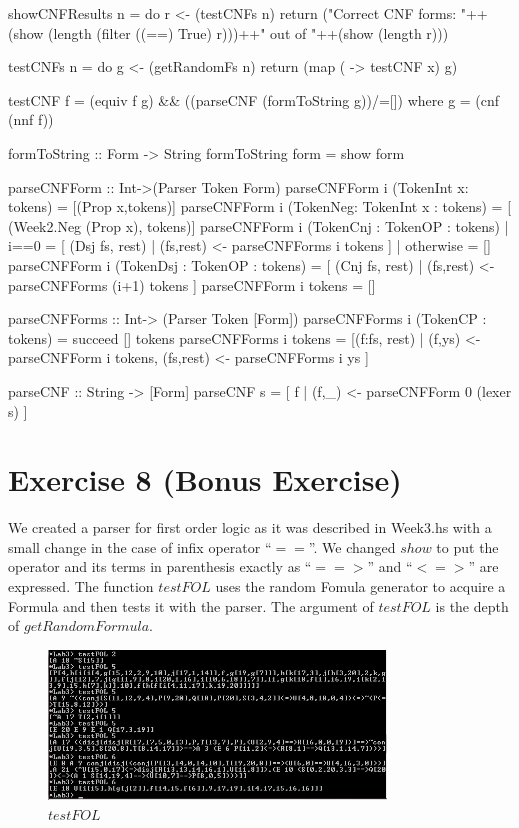 \documentclass{article}
\begin{document}
\begin{code}
showCNFResults n = do
		      r <- (testCNFs n)
		      return ("Correct CNF forms: "++(show (length (filter ((==)
				True) r)))++" out of "++(show (length r)))

testCNFs n = do
		      g <- (getRandomFs n)
		      return (map ( \x -> testCNF x) g)
 
testCNF f = (equiv f g) && ((parseCNF (formToString g))/=[]) where g = (cnf (nnf f))
 
formToString :: Form -> String
formToString form = show form

parseCNFForm :: Int->(Parser Token Form) 
parseCNFForm i (TokenInt x: tokens) = [(Prop x,tokens)]
parseCNFForm i (TokenNeg: TokenInt x : tokens) = [ (Week2.Neg (Prop x), tokens)]
parseCNFForm i (TokenCnj : TokenOP : tokens) | i==0 = [ (Dsj fs, rest) | (fs,rest) <- parseCNFForms i tokens ]
					     | otherwise = []
parseCNFForm i (TokenDsj : TokenOP : tokens) = [ (Cnj fs, rest) | (fs,rest) <- parseCNFForms (i+1) tokens ]
parseCNFForm i tokens = []

parseCNFForms :: Int-> (Parser Token [Form]) 
parseCNFForms i (TokenCP : tokens) = succeed [] tokens
parseCNFForms i tokens = [(f:fs, rest) | (f,ys) <- parseCNFForm i tokens, (fs,rest) <- parseCNFForms i ys ]

parseCNF :: String -> [Form]
parseCNF s = [ f | (f,_) <- parseCNFForm 0 (lexer s) ]
\end{code}

\section*{Exercise 8 (Bonus Exercise)}
We created a parser for first order logic as it was described in Week3.hs
with a small change in the case of infix operator ``$==$''. We changed $show$
to put the operator and its terms in parenthesis exactly as ``$ = = > $'' and
``$ < = >$'' are expressed. The function $testFOL$ uses the random Fomula
generator to acquire a Formula and then tests it with the parser. The argument
of $testFOL$ is the depth of $getRandomFormula$.

\begin{figure}[ht]
\centering
\includegraphics[width=0.8\textwidth]{FOLparser.jpg}
\caption{$testFOL$}
\label{fig:tstFOL}
\end{figure}
\end{document}
